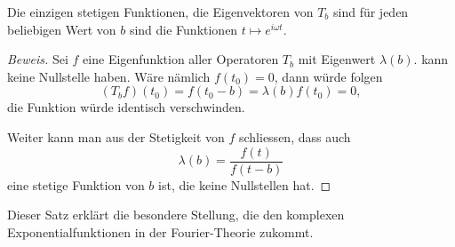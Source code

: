 
\begin{satz}
Die einzigen stetigen Funktionen, die Eigenvektoren von $T_b$ sind für
jeden beliebigen Wert von $b$ sind die Funktionen $t\mapsto e^{i\omega t}$.
\end{satz}

\begin{proof}[Beweis]
Sei $f$ eine Eigenfunktion aller Operatoren $T_b$ mit Eigenwert $\lambda(b)$.
 kann keine Nullstelle haben.
Wäre nämlich $f(t_0)=0$, dann würde folgen
\[
(T_bf)(t_0) = f(t_0-b) = \lambda(b) f(t_0) = 0,
\]
die Funktion würde identisch verschwinden.

Weiter kann man aus der Stetigkeit von $f$ schliessen, dass auch
\[
\lambda(b) = \frac{f(t)}{f(t-b)}
\]
eine stetige Funktion von $b$ ist, die keine Nullstellen hat.
\end{proof}

Dieser Satz erklärt die besondere Stellung, die den komplexen
Exponentialfunktionen in der Fourier-Theorie zukommt.
